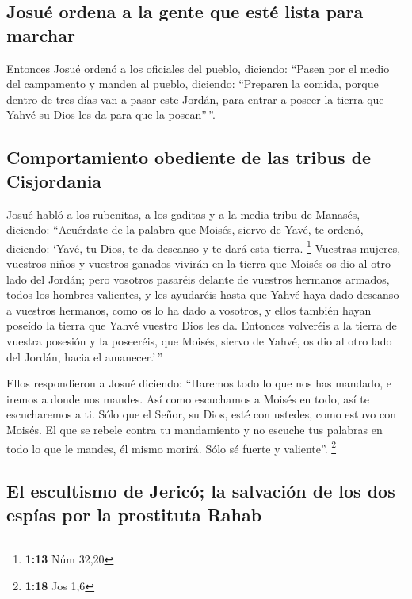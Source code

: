 \hypertarget{josuuxe9-ordena-a-la-gente-que-estuxe9-lista-para-marchar}{%
\subsection{Josué ordena a la gente que esté lista para
marchar}\label{josuuxe9-ordena-a-la-gente-que-estuxe9-lista-para-marchar}}

 Entonces Josué ordenó a los oficiales del pueblo,
diciendo:  ``Pasen por el medio del campamento y manden
al pueblo, diciendo: ``Preparen la comida, porque dentro de tres días
van a pasar este Jordán, para entrar a poseer la tierra que Yahvé su
Dios les da para que la posean''\,''.

\hypertarget{comportamiento-obediente-de-las-tribus-de-cisjordania}{%
\subsection{Comportamiento obediente de las tribus de
Cisjordania}\label{comportamiento-obediente-de-las-tribus-de-cisjordania}}

 Josué habló a los rubenitas, a los gaditas y a la media
tribu de Manasés, diciendo:  ``Acuérdate de la palabra
que Moisés, siervo de Yavé, te ordenó, diciendo: `Yavé, tu Dios, te da
descanso y te dará esta tierra. \footnote{\textbf{1:13} Núm 32,20}
 Vuestras mujeres, vuestros niños y vuestros ganados
vivirán en la tierra que Moisés os dio al otro lado del Jordán; pero
vosotros pasaréis delante de vuestros hermanos armados, todos los
hombres valientes, y les ayudaréis  hasta que Yahvé haya
dado descanso a vuestros hermanos, como os lo ha dado a vosotros, y
ellos también hayan poseído la tierra que Yahvé vuestro Dios les da.
Entonces volveréis a la tierra de vuestra posesión y la poseeréis, que
Moisés, siervo de Yahvé, os dio al otro lado del Jordán, hacia el
amanecer.'\,''

 Ellos respondieron a Josué diciendo: ``Haremos todo lo
que nos has mandado, e iremos a donde nos mandes.  Así
como escuchamos a Moisés en todo, así te escucharemos a ti. Sólo que el
Señor, su Dios, esté con ustedes, como estuvo con Moisés.
 El que se rebele contra tu mandamiento y no escuche tus
palabras en todo lo que le mandes, él mismo morirá. Sólo sé fuerte y
valiente''. \footnote{\textbf{1:18} Jos 1,6}

\hypertarget{el-escultismo-de-jericuxf3-la-salvaciuxf3n-de-los-dos-espuxedas-por-la-prostituta-rahab}{%
\subsection{El escultismo de Jericó; la salvación de los dos espías por
la prostituta
Rahab}\label{el-escultismo-de-jericuxf3-la-salvaciuxf3n-de-los-dos-espuxedas-por-la-prostituta-rahab}}

